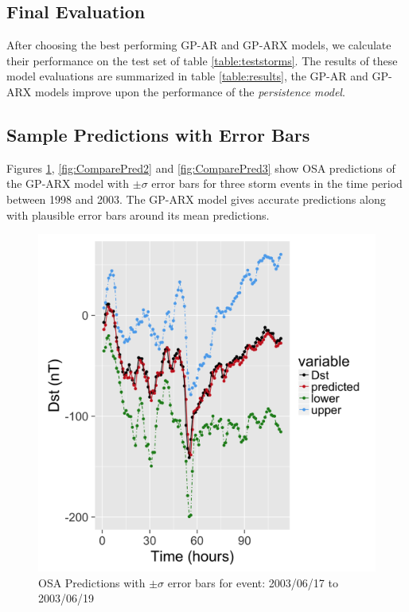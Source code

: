 \documentclass{article}
\begin{document}
\subsection*{Final Evaluation}

After choosing the best performing GP-AR and GP-ARX models, we
calculate their performance on the test set of table
\ref{table:teststorms}. The results of these model evaluations are
summarized in table \ref{table:results}, the GP-AR and GP-ARX models
improve upon the performance of the \emph{persistence model}.

\subsection*{Sample Predictions with Error Bars}

Figures \ref{fig:ComparePred1}, \ref{fig:ComparePred2} and
\ref{fig:ComparePred3} show OSA predictions of the GP-ARX model with
$\pm \sigma$ error bars for three storm events in the time period
between 1998 and 2003. The GP-ARX model gives accurate predictions
along with plausible error bars around its mean predictions.


\begin{figure}[h]
  \includegraphics[width=\textwidth]{PredictionsModel1/PredErrBars_Storm43.png}
  \caption{OSA Predictions with $\pm \sigma$ error bars for event: 2003/06/17 to 2003/06/19}
  \label{fig:ComparePred1}
\end{figure}
\end{document}
